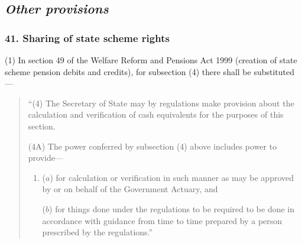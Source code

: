 \documentclass[12pt,a4paper]{article}
\begin{document}
\subsection{\itshape Other provisions}

%
%


\subsubsection{41. Sharing of state scheme rights}

(1) In section 49 of the Welfare Reform and Pensions Act 1999 (creation of state scheme pension debits and credits), for subsection (4)  there shall be substituted—
\begin{quotation}
“(4) The Secretary of State may by regulations make provision about the calculation and verification of cash equivalents for the purposes of this section.

(4A) The power conferred by subsection (4)  above includes power to provide—
\begin{enumerate}\item[]
($a$) for calculation or verification in such manner as may be approved by or on behalf of the Government Actuary, and

($b$) for things done under the regulations to be required to be done in accordance with guidance from time to time prepared by a person prescribed by the regulations.”
\end{enumerate}
\end{quotation}
\end{document}

